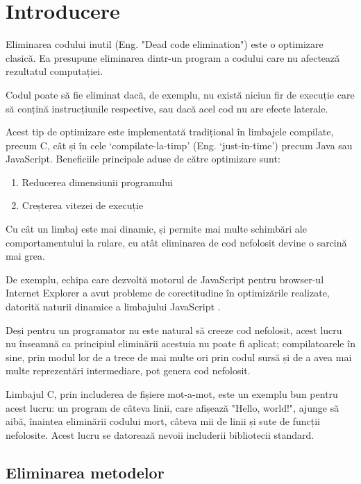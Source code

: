 \chapter{Introducere}

Eliminarea codului inutil (Eng. "Dead code elimination")
\cite{wiki:deadcodeelimination} este o optimizare clasică.  Ea
presupune eliminarea dintr-un program a codului care nu afectează
rezultatul computației.

Codul poate să fie eliminat dacă, de exemplu, nu există niciun fir
de execuție care să conțină instrucțiunile respective, sau dacă
acel cod nu are efecte laterale.

Acest tip de optimizare este implementată tradițional în
limbajele compilate, precum C, cât și în cele `compilate-la-timp'
(Eng. `just-in-time') precum Java sau JavaScript.  Beneficiile
principale aduse de către optimizare sunt:

\begin{enumerate}
	\item Reducerea dimensiunii programului
	\item Creșterea vitezei de execuție
\end{enumerate}

Cu cât un limbaj este mai dinamic, și permite mai multe schimbări ale
comportamentului la rulare, cu atât eliminarea de cod nefolosit
devine o sarcină mai grea.

De exemplu, echipa care dezvoltă motorul de JavaScript pentru
browser-ul Internet Explorer a avut probleme de corectitudine în
optimizările realizate, datorită naturii dinamice a limbajului
JavaScript \cite{deadcodeeliminationforbeginners}.

Deși pentru un programator nu este natural să creeze cod
nefolosit, acest lucru nu înseamnă ca principiul eliminării
acestuia nu poate fi aplicat; compilatoarele în sine, prin modul
lor de a trece de mai multe ori prin codul sursă și de a avea mai
multe reprezentări intermediare, pot genera cod nefolosit.

Limbajul C, prin includerea de fișiere mot-a-mot, este un exemplu
bun pentru acest lucru: un program de câteva linii, care afișează
"Hello, world!", ajunge să aibă, înaintea eliminării codului mort,
câteva mii de linii și sute de funcții nefolosite. Acest lucru se datorează
nevoii includerii bibliotecii standard.

\section{Eliminarea metodelor}

